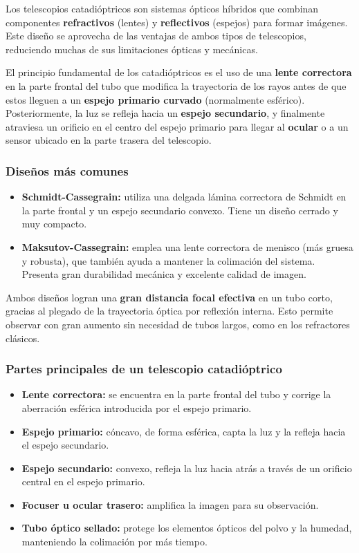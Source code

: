 Los telescopios catadióptricos son sistemas ópticos híbridos que combinan componentes \textbf{refractivos} (lentes) y \textbf{reflectivos} (espejos) para formar imágenes. Este diseño se aprovecha de las ventajas de ambos tipos de telescopios, reduciendo muchas de sus limitaciones ópticas y mecánicas.

El principio fundamental de los catadióptricos es el uso de una \textbf{lente correctora} en la parte frontal del tubo que modifica la trayectoria de los rayos antes de que estos lleguen a un \textbf{espejo primario curvado} (normalmente esférico). Posteriormente, la luz se refleja hacia un \textbf{espejo secundario}, y finalmente atraviesa un orificio en el centro del espejo primario para llegar al \textbf{ocular} o a un sensor ubicado en la parte trasera del telescopio.

\subsubsection*{Diseños más comunes}

\begin{itemize}
	\item \textbf{Schmidt-Cassegrain:} utiliza una delgada lámina correctora de Schmidt en la parte frontal y un espejo secundario convexo. Tiene un diseño cerrado y muy compacto.
	\item \textbf{Maksutov-Cassegrain:} emplea una lente correctora de menisco (más gruesa y robusta), que también ayuda a mantener la colimación del sistema. Presenta gran durabilidad mecánica y excelente calidad de imagen.
\end{itemize}

Ambos diseños logran una \textbf{gran distancia focal efectiva} en un tubo corto, gracias al plegado de la trayectoria óptica por reflexión interna. Esto permite observar con gran aumento sin necesidad de tubos largos, como en los refractores clásicos.

\subsubsection*{Partes principales de un telescopio catadióptrico}

\begin{itemize}
	\item \textbf{Lente correctora:} se encuentra en la parte frontal del tubo y corrige la aberración esférica introducida por el espejo primario.
	\item \textbf{Espejo primario:} cóncavo, de forma esférica, capta la luz y la refleja hacia el espejo secundario.
	\item \textbf{Espejo secundario:} convexo, refleja la luz hacia atrás a través de un orificio central en el espejo primario.
	\item \textbf{Focuser u ocular trasero:} amplifica la imagen para su observación.
	\item \textbf{Tubo óptico sellado:} protege los elementos ópticos del polvo y la humedad, manteniendo la colimación por más tiempo.
\end{itemize}


